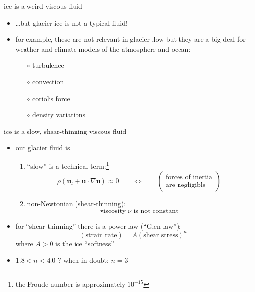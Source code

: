 \documentclass[hide notes,intlimits]{beamer}
\begin{document}
\begin{frame}{ice is a weird viscous fluid}

\begin{itemize}
\item \dots but glacier ice is not a typical fluid!
\item for example, these are not relevant in glacier flow but they are a big deal for weather and climate models of the atmosphere and ocean:
  \begin{itemize}
  \item[$\circ$] turbulence
  \item[$\circ$] convection
  \item[$\circ$] coriolis force
  \item[$\circ$] density variations
  \end{itemize}
\end{itemize}
\end{frame}


\begin{frame}{ice is a slow, shear-thinning viscous fluid}

\begin{itemize}
\item our glacier fluid is
  \begin{enumerate}
  \item ``slow'' is a technical term:\footnote{the Froude number is approximately $10^{-15}$}
    $$\rho \left(\mathbf{u}_t + \mathbf{u}\cdot\nabla \mathbf{u}\right) \approx 0 \qquad \iff \qquad \begin{pmatrix} \text{forces of inertia} \\ \text{are negligible} \end{pmatrix}$$
  \item non-Newtonian (shear-thinning):
    $$\text{viscosity $\nu$ is not constant}$$
  \end{enumerate}

\medskip
\item for ``shear-thinning'' there is a power law (``Glen law''):
  $$(\text{strain rate}) = A (\text{shear stress})^n$$
where $A>0$ is the ice ``softness''
\item $1.8 < n < 4.0$ ?  \quad when in doubt: \alert{$n=3$}
\end{itemize}
\end{frame}
\end{document}
